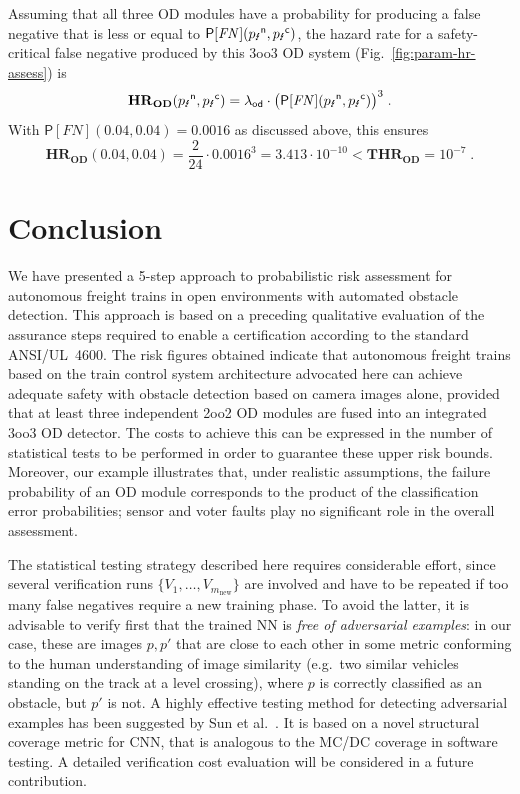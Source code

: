 \documentclass[runningheads,a4paper]{llncs}
\begin{document}
Assuming that all three OD modules have a probability for producing a false negative that is less or equal to $\mathsf{P}[\mathit{FN}]({p_\text{\Lightning}}^\mathsf{n},{p_\text{\Lightning}}^\mathsf{c})$, the  hazard rate for a safety-critical false negative produced by this 3oo3 OD system (Fig.~\ref{fig:param-hr-assess}) is  
\begin{equation}
  \label{eq:hazard-rate}
  \mathbf{HR}_\mathbf{OD}({p_\text{\Lightning}}^\mathsf{n},{p_\text{\Lightning}}^\mathsf{c})
  = \lambda_{\mathsf{od}}
  \cdot \big(\mathsf{P}[\mathit{FN}]({p_\text{\Lightning}}^\mathsf{n},{p_\text{\Lightning}}^\mathsf{c})\big)^3 \;.
\end{equation}
With $\mathsf{P}[\mathit{FN}](0.04,0.04) = 0.0016$ as discussed above, this ensures
$$
   \mathbf{HR}_\mathbf{OD}(0.04,0.04) = \frac{2}{24} \cdot 0.0016^3 = 3.413\cdot 10^{-10} < \mathbf{THR}_\mathbf{OD} = 10^{-7}\;.
$$

  
 
\section{Conclusion}\label{sec:conc}
 

 

We have presented a   5-step approach to probabilistic risk assessment for autonomous freight trains in open environments with automated obstacle detection. This approach is based on a preceding qualitative evaluation of the assurance steps required to 
enable a certification according to the standard ANSI/UL~4600\xspace. The risk figures obtained indicate that autonomous freight trains based on the train control system architecture advocated here can achieve adequate safety with obstacle detection based on camera images alone,  provided that at least three independent 2oo2 OD modules are fused into an integrated 3oo3 OD detector. 
The costs to achieve this  can be expressed in the number of statistical tests to be performed in order to guarantee these upper risk bounds. 
Moreover, our example illustrates that, under realistic assumptions, the failure probability of an OD module corresponds to the product of the classification error probabilities; sensor and voter faults play no significant role in the overall assessment.

The statistical testing strategy described here   requires considerable effort, since several verification runs $\{ V_1,\dots,V_{m_\text{new}} \}$ are involved and have to be repeated if too many false negatives require a new training phase. To avoid the latter, it is advisable to verify first that the trained NN is \emph{free of adversarial examples}: in our case, these are images $p, p'$ that are close to each other in some metric conforming to the human understanding of image similarity (e.g.~two similar vehicles standing on the track at a level crossing), where $p$ is correctly classified as an obstacle, but $p'$ is not. A highly effective testing method for detecting adversarial examples has been suggested by Sun et al.~\cite{sun_concolic_2018}. It is based on a novel structural coverage metric for CNN, that is analogous to the MC/DC coverage in software testing. A detailed verification  cost evaluation will be considered in a future contribution.
\end{document}

